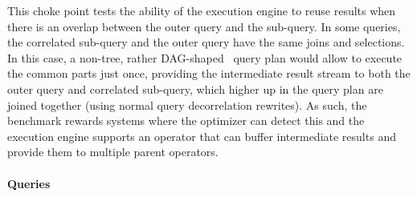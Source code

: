 
This choke point tests the ability of the execution engine to reuse results when there is an overlap between the outer query and the sub-query. In some queries, the correlated sub-query and the outer query have the same joins and selections.
In this case, a non-tree, rather DAG-shaped~\cite{DBLP:conf/btw/NeumannM09} query plan would allow to execute the common parts just once, providing the intermediate result stream to both the outer query and correlated sub-query,
which higher up in the query plan are joined together (using normal query decorrelation rewrites).
As such, the benchmark rewards systems where the optimizer can detect this and the execution engine supports an operator that can buffer intermediate results and provide them to multiple parent operators.


\paragraph{Queries}
{\raggedright

}